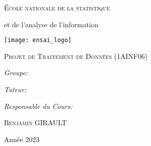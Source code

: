 \begin{titlepage}
\begin{center}

{\LARGE\scshape
École nationale de la statistique

et de l'analyse de l'information}

\vspace{5mm}
\texttt{[image: ensai\_logo]}
\vspace{1cm}

\textsc{\LARGE Projet de Traitement de Données (1AINF06)}

\vspace{0.5cm}

{\huge
\HRule

\vspace{0.4cm}

\bfseries\makeatletter\@title\makeatother

\vspace{0.4cm}

\HRule}

\vspace{1.5cm}


\begin{flushleft}
    \Large
    \emph{Groupe:}

    \scshape\makeatletter\@author\makeatother
\end{flushleft}

\begin{flushright}
    \Large
    \emph{Tuteur:}

    \textsc{\tuteur}

    \emph{Responsable du Cours:}

    \textsc{Benjamin GIRAULT}
\end{flushright}


\vfill
{\large Année 2023}
\end{center}
\end{titlepage}
